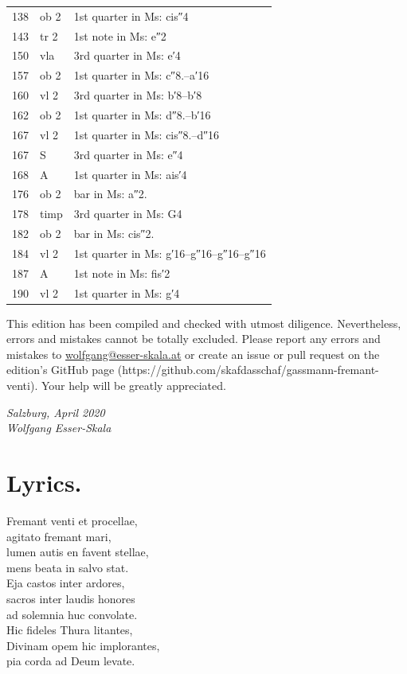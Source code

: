 \documentclass[parskip=full]{scrreprt}
\newif\iftemplate\templatetrue
\begin{document}
\begin{longtable}{ll L{10cm}}
	138   & ob 2  & 1st quarter in Ms: cis″4 \\
	143   & tr 2  & 1st note in Ms: e″2 \\
	150   & vla   & 3rd quarter in Ms: e′4 \\
	157   & ob 2  & 1st quarter in Ms: c″8.–a′16 \\
	160   & vl 2  & 3rd quarter in Ms: b′8–b′8 \\
	162   & ob 2  & 1st quarter in Ms: d″8.–b′16 \\
	167   & vl 2  & 1st quarter in Ms: cis″8.–d″16 \\
	167   & S     & 3rd quarter in Ms: e″4 \\
	168   & A     & 1st quarter in Ms: ais′4 \\
	176   & ob 2  & bar in Ms: a″2. \\
	178   & timp  & 3rd quarter in Ms: G4 \\
	182   & ob 2  & bar in Ms: cis″2. \\
	184   & vl 2  & 1st quarter in Ms: g′16–g″16–g″16–g″16 \\
	187   & A     & 1st note in Ms: fis′2 \\
	190   & vl 2  & 1st quarter in Ms: g′4 \\
	\bottomrule
\end{longtable}


This edition has been compiled and checked with utmost diligence. Nevertheless, errors and mistakes cannot be totally excluded. Please report any errors and mistakes to \url{wolfgang@esser-skala.at} or create an issue or pull request on the edition’s GitHub page (https://github.com/skafdasschaf/gassmann-fremant-venti). Your help will be greatly appreciated.

\bigskip
\textit{Salzburg, April 2020\\
Wolfgang Esser-Skala}


\chapter*{Lyrics.}


Fremant venti et procellae,\\
agitato fremant mari,\\
lumen autis en favent stellae,\\
mens beata in salvo stat.\\
Eja castos inter ardores,\\
sacros inter laudis honores\\
ad solemnia huc convolate.\\
Hic fideles Thura litantes,\\
Divinam opem hic implorantes,\\
pia corda ad Deum levate.

\cleardoublepage
\fi

\iftemplate

\fi
\end{document}
